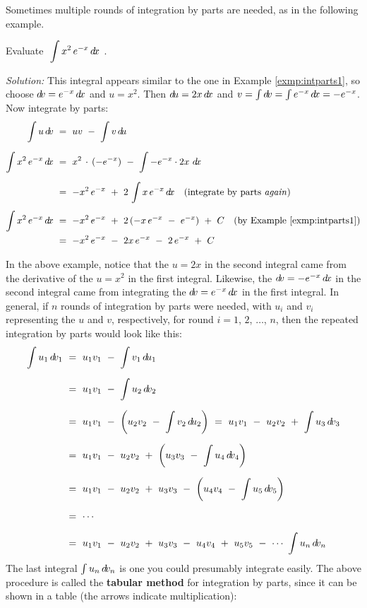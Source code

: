 \divider
\vspace{2mm}
Sometimes multiple rounds of integration by parts are needed, as in the
following example.
\newpage
\begin{exmp}\label{exmp:intparts5}
\noindent Evaluate $~\displaystyle\int x^2\,e^{-x}\,d\!x~$.\vspace{1mm}
\par\noindent\emph{Solution:} This integral appears similar to the one in
Example \ref{exmp:intparts1}, so choose $d\!v = e^{-x}\,d\!x$ and $u = x^2$. Then
$d\!u = 2x\,d\!x$ and $v = \int d\!v = \int e^{-x}\,d\!x = -e^{-x}$. Now integrate by parts:
\begin{align*}
\int u\,d\!v ~&=~ uv ~-~ \int v\,d\!u\\[6pt]
\int x^2\,e^{-x}\,d\!x ~&=~ x^2\,\cdot\,(-e^{-x}) ~-~
 \int -e^{-x} \cdot 2x~d\!x\\[6pt]
&=~ -x^2\,e^{-x} ~+~ 2\,\int x\,e^{-x}\,d\!x\quad\text{(integrate by parts \emph{again})}\\[4pt]
\int x^2\,e^{-x}\,d\!x ~&=~ -x^2\,e^{-x} ~+~
 2\,(-x\,e^{-x} ~-~ e^{-x}) ~+~ C\quad\text{(by Example \ref{exmp:intparts1})}\\
&=~ -x^2\,e^{-x} ~-~ 2x\,e^{-x} ~-~ 2\,e^{-x} ~+~ C
\end{align*}
\end{exmp}\vspace{-2mm}
\divider
\vspace{2mm}

In the above example, notice that the $u=2x$ in the second integral came from
the derivative of the $u=x^2$ in the first integral. Likewise, the
$d\!v =-e^{-x}\,d\!x$ in the second integral came from integrating the
$d\!v=e^{-x}\,d\!x$ in the first integral. In general, if $n$ rounds of
integration by parts were needed, with $u_i$ and $v_i$ representing the $u$ and
$v$, respectively, for round $i =1$, $2$, $\ldots$, $n$, then the repeated
integration by parts would look like this:
\begin{align*}
\int u_1\,\dv_1 ~&=~ u_1v_1 ~-~ \int v_1\,\du_1\\[6pt]
&=~ u_1v_1 ~-~ \int u_2\,\dv_2\\[6pt]
&=~ u_1v_1 ~-~ \left(u_2v_2 ~-~ \int v_2\,\du_2\right) ~=~
    u_1v_1 ~-~ u_2v_2 ~+~ \int u_3\,\dv_3\\[6pt]
&=~ u_1v_1 ~-~ u_2v_2 ~+~ \left(u_3v_3 ~-~ \int u_4\,\dv_4\right)\\[6pt]
&=~ u_1v_1 ~-~ u_2v_2 ~+~ u_3v_3 ~-~ \left(u_4v_4 ~-~ \int u_5\,\dv_5\right)\\[6pt]
&=~ \cdots\\[6pt]
&=~ u_1v_1 ~-~ u_2v_2 ~+~ u_3v_3 ~-~ u_4v_4 ~+~ u_5v_5 ~-~ \cdots ~ \int u_n\,\dv_n
\end{align*}
The last integral $\int u_n\,d\!v_n$ is one you could presumably integrate
easily.
\newpage
The above procedure is called the
\textbf{tabular method} for integration by parts, since it can be shown in a table (the
arrows indicate multiplication):

